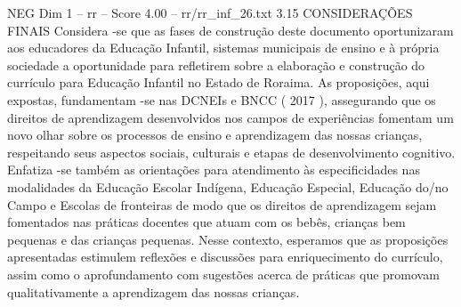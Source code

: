 \begin{textsample}{NEG Dim 1 – rr – Score 4.00 – rr/rr\_inf\_26.txt}  \label{ex:f1_neg_077}
3.15 CONSIDERAÇÕES FINAIS Considera -se que as fases de construção deste documento oportunizaram aos educadores da Educação Infantil, sistemas municipais de ensino e à própria sociedade a oportunidade para refletirem sobre a elaboração e construção do currículo para Educação Infantil no Estado de Roraima.
As proposições, aqui expostas, fundamentam -se nas DCNEIs e BNCC ( 2017 ), assegurando que os direitos de aprendizagem desenvolvidos nos campos de experiências fomentam um novo olhar sobre os processos de ensino e aprendizagem das nossas crianças, respeitando seus aspectos sociais, culturais e etapas de desenvolvimento cognitivo.
Enfatiza -se também as orientações para atendimento às especificidades nas modalidades da Educação Escolar Indígena, Educação Especial, Educação do/no Campo e Escolas de fronteiras de modo que os direitos de aprendizagem sejam fomentados nas práticas docentes que atuam com os bebês, crianças bem pequenas e das crianças pequenas.
Nesse contexto, esperamos que as proposições apresentadas estimulem reflexões e discussões para enriquecimento do currículo, assim como o aprofundamento com sugestões acerca de práticas que promovam qualitativamente a aprendizagem das nossas crianças.

\end{textsample}
